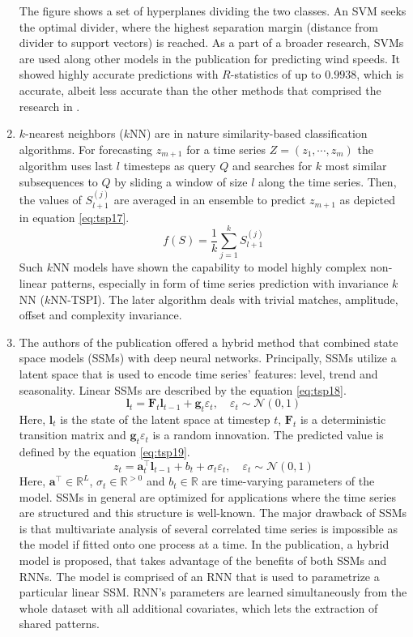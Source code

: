 \documentclass[3p,times,procedia]{elsarticle}
\begin{document}
\begin{enumerate}
The figure shows a set of hyperplanes dividing the two classes. An SVM seeks the optimal divider, where the highest separation margin (distance from divider to support vectors) is reached.
As a part of a broader research, SVMs are used along other models in the publication \cite{khosravi2018time} for predicting wind speeds. It showed highly accurate predictions with $R$-statistics of up to $0.9938$, which is accurate, albeit less accurate than the other methods that comprised the research in \cite{khosravi2018time}. 
\item $k$-nearest neighbors ($k$NN) are in nature similarity-based classification algorithms. For forecasting $z_{m+1}$ for a time series $Z = (z_1, \cdots, z_m)$ the algorithm uses last $l$ timesteps as query $Q$ and searches for $k$ most similar subsequences to $Q$ by sliding a window of size $l$ along the time series. Then, the values of $S_{l+1}^{(j)}$ are averaged in an ensemble to predict $z_{m+1}$ as depicted in equation \ref{eq:tsp17}.
\begin{equation} \label{eq:tsp17}
f(S) = \frac{1}{k} \sum_{j=1}^k S_{l+1}^{(j)}
\end{equation}
Such $k$NN models have shown the capability to model highly complex non-linear patterns, especially in form of time series prediction with invariance $k$NN ($k$NN-TSPI). The later algorithm deals with trivial matches, amplitude, offset and complexity invariance.
\item The authors of the publication \cite{rangapuram2018deep} offered a hybrid method that combined state space models (SSMs) with deep neural networks. Principally, SSMs utilize a latent space that is used to encode time series' features: level, trend and seasonality. Linear SSMs are described by the equation \ref{eq:tsp18}.
\begin{equation} \label{eq:tsp18}
\mathbf{l}_t = \mathbf{F}_t\mathbf{l}_{t-1} + \mathbf{g}_t \varepsilon_t, \quad \varepsilon_t \sim \mathcal{N} (0,1)
\end{equation}
Here, $\mathbf{l}_t$ is the state of the latent space at timestep $t$, $\mathbf{F}_t$ is a deterministic transition matrix and $\mathbf{g}_t \varepsilon_t$ is a random innovation. The predicted value is defined by the equation \ref{eq:tsp19}.
\begin{equation} \label{eq:tsp19}
z_t = \mathbf{a}_t^\top \mathbf{l}_{t-1} + b_t + \sigma_t \varepsilon_t, \quad \varepsilon_t \sim \mathcal{N} (0,1)
\end{equation}
Here, $\mathbf{a}^\top \in \mathbb{R}^L$, $\sigma_t \in\mathbb{R}^{>0}$ and $b_t \in \mathbb{R}$ are time-varying parameters of the model.
SSMs in general are optimized for applications where the time series are structured and this structure is well-known. The major drawback of SSMs is that multivariate analysis of several correlated time series is impossible as the model if fitted onto one process at a time. In the publication, a hybrid model is proposed, that takes advantage of the benefits of both SSMs and RNNs. The model is comprised of an RNN that is used to parametrize a particular linear SSM. RNN's parameters are learned simultaneously from the whole dataset with all additional covariates, which lets the extraction of shared patterns.


\end{enumerate}
\end{document}
